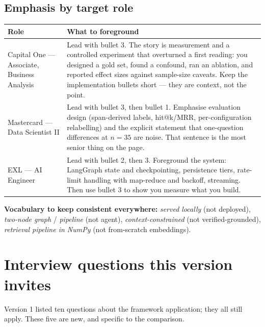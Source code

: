 \documentclass[11pt,a4paper]{article}
\begin{document}
\subsection{Emphasis by target role}

\begin{longtable}{@{}R{4.0cm}R{11.2cm}@{}}
\toprule
\textbf{Role} & \textbf{What to foreground} \\
\midrule
\endhead
Capital One --- Associate, Business Analysis &
Lead with bullet 3. The story is measurement and a controlled experiment that
overturned a first reading: you designed a gold set, found a confound, ran an
ablation, and reported effect sizes against sample-size caveats. Keep the
implementation bullets short --- they are context, not the point. \\
\addlinespace
Mastercard --- Data Scientist II &
Lead with bullet 3, then bullet 1. Emphasise evaluation design (span-derived
labels, hit@k/MRR, per-configuration relabelling) and the explicit statement that
one-question differences at $n=35$ are noise. That sentence is the most senior
thing on the page. \\
\addlinespace
EXL --- AI Engineer &
Lead with bullet 2, then 3. Foreground the system: LangGraph state and
checkpointing, persistence tiers, rate-limit handling with map-reduce and
backoff, streaming. Then use bullet 3 to show you measure what you build. \\
\bottomrule
\end{longtable}

\noindent
\textbf{Vocabulary to keep consistent everywhere:} \emph{served locally} (not
deployed), \emph{two-node graph} / \emph{pipeline} (not agent),
\emph{context-constrained} (not verified-grounded), \emph{retrieval pipeline in
NumPy} (not from-scratch embeddings).

\section{Interview questions this version invites}

Version 1 listed ten questions about the framework application; they all still
apply. These five are new, and specific to the comparison.
\end{document}
